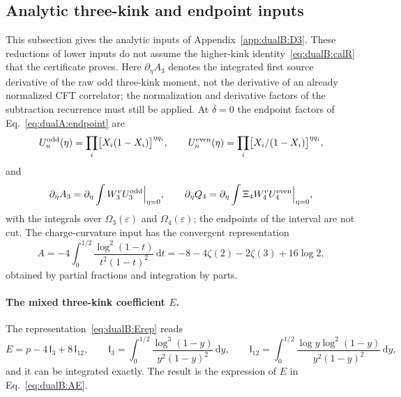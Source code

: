 \documentclass[11pt,a4paper]{article}
\numberwithin{equation}{section}
\newcommand{\dd}{\,\mathrm d}
\newcommand{\db}{\bar\delta}
\begin{document}
\subsection{Analytic three-kink and endpoint inputs}\label{app:dualB:endpoints}
This subsection gives the analytic inputs of Appendix~\ref{app:dualB:D3}. These reductions of lower inputs do not
assume the higher-kink identity~\eqref{eq:dualB:calR} that the certificate proves. Here $\partial_\eta A_3$ denotes the integrated first source derivative
of the raw odd three-kink moment, not the derivative of an already normalized CFT correlator; the normalization and
derivative factors of the subtraction recurrence must still be applied. At $\db=0$ the endpoint factors of
Eq.~\eqref{eq:dualA:endpoint} are
\begin{equation}
 U_n^{\rm odd}(\eta)=\prod_i\bigl[X_i(1-X_i)\bigr]^{\eta q_i},\qquad
 U_n^{\rm even}(\eta)=\prod_i\bigl[X_i/(1-X_i)\bigr]^{\eta q_i},
\end{equation}
and
\begin{equation}
 \partial_\eta A_3=\partial_\eta\int W_3^vU_3^{\rm odd}\Big|_{\eta=0},\qquad
 \partial_\eta Q_4=\partial_\eta\int\Xi_4W_4^vU_4^{\rm even}\Big|_{\eta=0},
\end{equation}
with the integrals over $\Omega_3(\varepsilon)$ and $\Omega_4(\varepsilon)$; the endpoints of the interval are not cut.
The charge-curvature input has the convergent representation
\begin{equation}
 A=-4\int_0^{1/2}\frac{\log^2(1-t)}{t^2(1-t)^2}\dd t=-8-4\zeta(2)-2\zeta(3)+16\log2,
\end{equation}
obtained by partial fractions and integration by parts.

\paragraph{The mixed three-kink coefficient $E$.} The representation~\eqref{eq:dualB:Erep} reads
\begin{equation}
 E=p-4\,\mathsf I_3+8\,\mathsf I_{12},\qquad
 \mathsf I_3=\int_0^{1/2}\frac{\log^3(1-y)}{y^2(1-y)^2}\dd y,\qquad
 \mathsf I_{12}=\int_0^{1/2}\frac{\log y\log^2(1-y)}{y^2(1-y)^2}\dd y,
 \label{eq:dualB:Estart}
\end{equation}
and it can be integrated exactly. The result is the expression of $E$ in Eq.~\eqref{eq:dualB:AE}.
\end{document}
